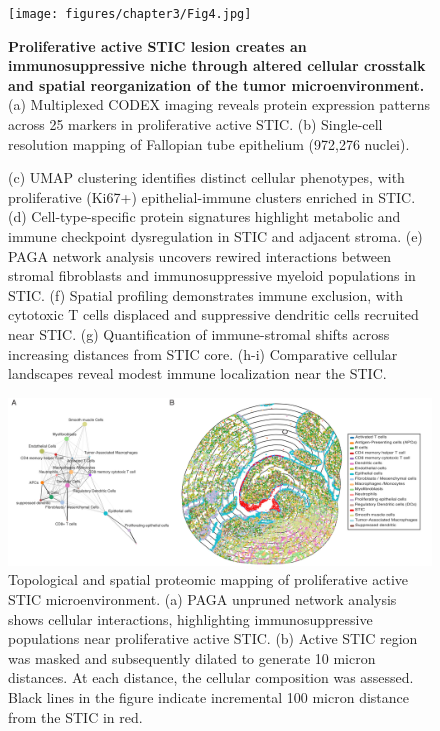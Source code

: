 \begin{refsection}
    \begin{figure}[p]
        \begin{center}
            \texttt{[image: figures/chapter3/Fig4.jpg]}
            \captionsetup{font=small}
            \caption{ \textbf{Proliferative active STIC lesion creates an immunosuppressive niche through altered cellular crosstalk and spatial reorganization of the tumor microenvironment.} (a) Multiplexed CODEX imaging reveals protein expression patterns across 25 markers in proliferative active STIC. (b) Single-cell resolution mapping of Fallopian tube epithelium (972,276 nuclei).}
            \label{chapter3_fig4}
        \end{center}
    \end{figure}
    
    \begin{figure}[h!]
        \ContinuedFloat
        \captionsetup{font=small}
        \caption[]{(c) UMAP clustering identifies distinct cellular phenotypes, with proliferative (Ki67+) epithelial-immune clusters enriched in STIC. (d) Cell-type-specific protein signatures highlight metabolic and immune checkpoint dysregulation in STIC and adjacent stroma. (e) PAGA network analysis uncovers rewired interactions between stromal fibroblasts and immunosuppressive myeloid populations in STIC. (f) Spatial profiling demonstrates immune exclusion, with cytotoxic T cells displaced and suppressive dendritic cells recruited near STIC. (g) Quantification of immune-stromal shifts across increasing distances from STIC core. (h-i) Comparative cellular landscapes reveal modest immune localization near the STIC.}
    \end{figure}

    \begin{figure}[H]
        \begin{center}
            \includegraphics[width=1\textwidth,height=0.9\textheight,keepaspectratio,clip,page=1]{figures/chapter3/FigS3.jpg}
            \captionsetup{font=small}
            \caption{ Topological and spatial proteomic mapping of proliferative active STIC microenvironment. (a) PAGA unpruned network analysis shows cellular interactions, highlighting immunosuppressive populations near proliferative active STIC. (b) Active STIC region was masked and subsequently dilated to generate 10 micron distances. At each distance, the cellular composition was assessed. Black lines in the figure indicate incremental 100 micron distance from the STIC in red.}
            \label{chapter3_figS3}
        \end{center}
    \end{figure}
    

\end{refsection}
